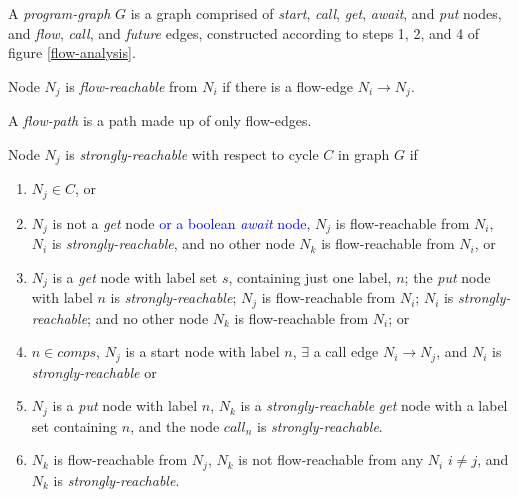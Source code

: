 \documentclass[12pt]{article}%
\newcommand{\Blue}[1] {\textcolor{blue}{#1}}%
\begin{document}

\begin{definition}\label{def-program-graph}
A \emph{program-graph} $G$ is a graph comprised of \emph{start}, \emph{call}, \emph{get}, \emph{await}, and \emph{put} nodes,
and \emph{flow}, \emph{call}, and \emph{future} edges, constructed according to steps 1, 2, and 4 of figure \ref{flow-analysis}.
\end{definition}

\begin{definition}\label{def-flow-reachable}
Node $N_j$ is \emph{flow-reachable} from $N_i$ if there is a flow-edge $N_i \rightarrow N_j$. 
\end{definition}

\begin{definition}\label{def-flow-path}
A \emph{flow-path} is a path made up of only flow-edges.
\end{definition}

\begin{definition}\label{defn-sreachable}
Node $N_j$ is \emph{strongly-reachable} with respect to cycle $C$ in graph $G$ if
\begin{enumerate}
\item \label{sr-incycle} $N_j \in C$, or
\item $N_j$ is not a \emph{get} node \Blue{or a boolean \emph{await} node}, $N_j$ is flow-reachable from $N_i$, $N_i$ is \emph{strongly-reachable}, and 
no other node $N_k$ is flow-reachable from $N_i$, or
\item $N_j$ is a \emph{get} node with label set $s$, containing just one label, $n$;
the \emph{put} node with label $n$ is \emph{strongly-reachable};
$N_j$ is flow-reachable from $N_i$; $N_i$ is \emph{strongly-reachable};
and no other node $N_k$ is flow-reachable from $N_i$; or
\item \label{sr-start} $n \in {comps}$, $N_j$ is a start node with label $n$, $\exists$ a call edge $N_i \rightarrow N_j$, and $N_i$ is \emph{strongly-reachable} or

\item $N_j$ is a \emph{put} node with label $n$,
$N_k$ is a \emph{strongly-reachable} \emph{get} node with a label set containing $n$, and the node $call_n$ is \emph{strongly-reachable}.

\item $N_k$ is flow-reachable from $N_j$, $N_k$ is not flow-reachable from any  $N_i$ $i \not = j$, and $N_k$ is \emph{strongly-reachable}.%
\end{enumerate}
\end{definition}
\end{document}
